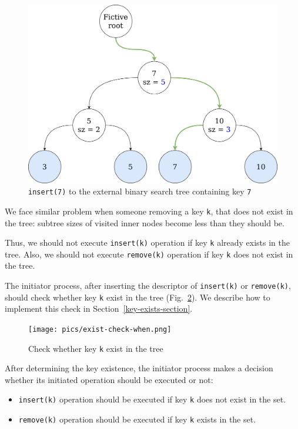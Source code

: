 \documentclass[times, dvipsnames,%
               languages={russian,english} %
              ]{itmo-student-thesis}
\begin{document}
\begin{figure}[H]
  \centering
  \caption{\texttt{insert(7)} to the external binary search tree containing key \texttt{7}}
  \label{second-insert-2-pic}
  \includegraphics[width=\linewidth]{pics/second-insert-2.png}
\end{figure}

We face similar problem when someone removing a key \texttt{k}, that does not exist in the tree: subtree sizes of visited inner nodes become less than they should be.

Thus, we should not execute \texttt{insert(k)} operation if key \texttt{k} already exists in the tree. Also, we should not execute \texttt{remove(k)} operation if key \texttt{k} does not exist in the tree.

The initiator process, after inserting the descriptor of \texttt{insert(k)} or \texttt{remove(k)}, should check whether key \texttt{k} exist in the tree (Fig.~\ref{exist-check-when-pic}). We describe how to implement this check in Section~\ref{key-exists-section}.

\begin{figure}[H]
  \centering
  \caption{Check whether key \texttt{k} exist in the tree}
  \label{exist-check-when-pic}
  \texttt{[image: pics/exist-check-when.png]}
\end{figure}

After determining the key existence, the initiator process makes a decision whether its initiated operation should be executed or not:

\begin{itemize}
    \item \texttt{insert(k)} operation should be executed if key \texttt{k} does not exist in the set.
    \item \texttt{remove(k)} operation should be executed if key \texttt{k} exists in the set.
\end{itemize}
\end{document}
